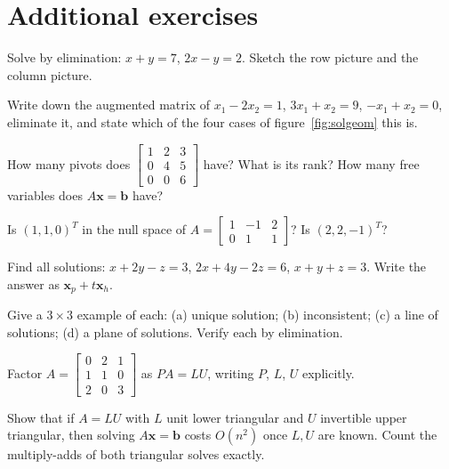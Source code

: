 \section*{Additional exercises}

\begin{exercise}[easy]
Solve by elimination: $x+y=7$, $2x-y=2$. Sketch the row picture and the column picture.
\end{exercise}
\begin{exercise}[easy]
Write down the augmented matrix of $x_1-2x_2=1$, $3x_1+x_2=9$, $-x_1+x_2=0$, eliminate it, and state which of the four cases of figure~\ref{fig:solgeom} this is.
\end{exercise}
\begin{exercise}[easy]
How many pivots does $\begin{bmatrix} 1 & 2 & 3\\ 0 & 4 & 5\\ 0 & 0 & 6\end{bmatrix}$ have? What is its rank? How many free variables does $A\mathbf{x}=\mathbf{b}$ have?
\end{exercise}
\begin{exercise}[easy]
Is $(1,1,0)^{T}$ in the null space of $A=\begin{bmatrix} 1 & -1 & 2\\ 0 & 1 & 1\end{bmatrix}$? Is $(2,2,-1)^{T}$?
\end{exercise}
\begin{exercise}[medium]
Find all solutions: $x+2y-z=3$, $2x+4y-2z=6$, $x+y+z=3$. Write the answer as $\mathbf{x}_p+t\mathbf{x}_h$.
\end{exercise}
\begin{exercise}[medium]
Give a $3\times3$ example of each: (a) unique solution; (b) inconsistent; (c) a line of solutions; (d) a plane of solutions. Verify each by elimination.
\end{exercise}
\begin{exercise}[medium]
Factor $A=\begin{bmatrix} 0 & 2 & 1\\ 1 & 1 & 0\\ 2 & 0 & 3\end{bmatrix}$ as $PA=LU$, writing $P$, $L$, $U$ explicitly.
\end{exercise}
\begin{exercise}[medium]
Show that if $A=LU$ with $L$ unit lower triangular and $U$ invertible upper triangular, then solving $A\mathbf{x}=\mathbf{b}$ costs $O(n^2)$ once $L,U$ are known. Count the multiply-adds of both triangular solves exactly.
\end{exercise}
